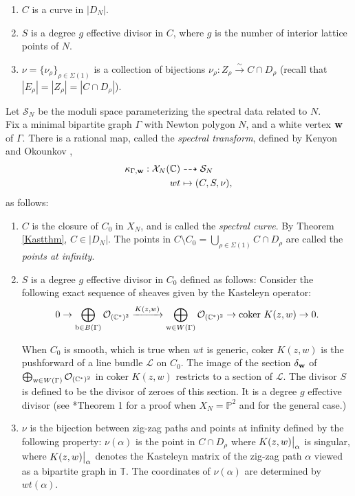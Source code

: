 \documentclass[11pt]{article} %
\theoremstyle{definition}
\newcommand{\C}{{\mathbb C}}
\newcommand{\T}{{\mathbb T}}
\renewcommand{\P}{{\mathbb P}}
\newcommand\restr[2]{{%
  \left.\kern-\nulldelimiterspace %
  #1 %
  \vphantom{\big|} %
  \right|_{#2} %
  }}
\newcommand{\ra}{\rightarrow}
\begin{document}
\begin{enumerate}
    \item $C$ is a curve in $|D_N|$.
    \item $S$ is a degree $g$ effective divisor in $C$, where $g$ is the number of interior lattice points of $N$.
    \item $\nu=\{\nu_\rho\}_{\rho \in \Sigma(1)}$ is a collection of bijections $\nu_\rho: Z_\rho \xrightarrow[]{\sim} C \cap D_\rho$ (recall that $|E_\rho|=|Z_\rho|=|C \cap D_\rho|$). 
    
\end{enumerate}
Let $\mathcal S_N$ be the moduli space parameterizing the spectral data related to $N$.\\


Fix a minimal bipartite graph $\Gamma$ with Newton polygon $N$, and a white vertex ${\bf w}$ of $\Gamma$. There is a rational map, called the \textit{spectral transform}, defined by Kenyon and Okounkov \cite{KO}, 
\begin{align*}
    \kappa_{\Gamma, {\bf w}}:\mathcal X_N (\C) & \dashrightarrow \mathcal S_N\\
    wt &\mapsto (C,S,\nu),
\end{align*}
as follows:
\begin{enumerate}
    \item $C$ is the closure of $C_0$ in $X_N$, and is called the \textit{spectral curve}. By Theorem \ref{Kastthm}, $C \in |D_N|$. The points in $C \setminus C_0 = \bigcup_{\rho \in \Sigma(1)} C \cap D_\rho$ are called the \textit{points at infinity}.
    \item $S$ is a degree $g$ effective divisor in $C_0$ defined as follows: Consider the following exact sequence of sheaves given by the Kasteleyn operator:
\begin{align*}  0 \ra \bigoplus_{\text b \in B(\Gamma)} \mathcal O_{(\C^*)^2} \xrightarrow[]{K(z,w)}\bigoplus_{\text w \in W(\Gamma)}\mathcal O_{(\C^*)^2} \ra \text{coker }K(z,w) \ra 0.
\end{align*}
    
    
    When $C_0$ is smooth, which is true when $wt$ is generic, coker $K(z,w)$ is the pushforward of a line bundle $\mathcal L$ on $C_0$. The image of the section $\delta_{\bf w}$ of $\bigoplus_{\text w \in W(\Gamma)}\mathcal O_{(\C^*)^2}$ in coker $K(z,w)$ restricts to a section of $\mathcal L$. The divisor $S$ is defined to be the divisor of zeroes of this section. It is a degree $g$ effective divisor (see \cite{KO}*{Theorem 1} for a proof when $X_N=\P^2$ and \cite{GGK} for the general case.)
    
    \item $\nu$ is the bijection between zig-zag paths and points at infinity defined by the following property: $\nu(\alpha)$ is the point in $C \cap D_\rho$ where $\restr{K(z,w)}{\alpha}$ is singular, where $\restr{K(z,w)}{\alpha}$ denotes the Kasteleyn matrix of the zig-zag path $\alpha$ viewed as a bipartite graph in $\T$. The coordinates of $\nu(\alpha)$ are determined by $wt(\alpha).$
\end{enumerate}
\end{document}
